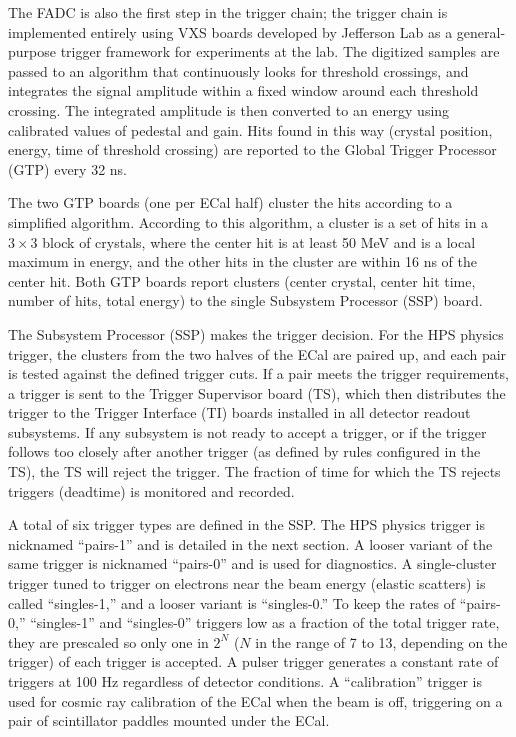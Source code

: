 The FADC is also the first step in the trigger chain; the trigger chain is implemented entirely using VXS boards developed by Jefferson Lab as a general-purpose trigger framework for experiments at the lab.
The digitized samples are passed to an algorithm that continuously looks for threshold crossings, and integrates the signal amplitude within a fixed window around each threshold crossing.
The integrated amplitude is then converted to an energy using calibrated values of pedestal and gain.
Hits found in this way (crystal position, energy, time of threshold crossing) are reported to the Global Trigger Processor (GTP) every 32 ns.

The two GTP boards (one per ECal half) cluster the hits according to a simplified algorithm.
According to this algorithm, a cluster is a set of hits in a $3\times 3$ block of crystals, where the center hit is at least 50 MeV and is a local maximum in energy, and the other hits in the cluster are within 16 ns of the center hit.
Both GTP boards report clusters (center crystal, center hit time, number of hits, total energy) to the single Subsystem Processor (SSP) board.

The Subsystem Processor (SSP) makes the trigger decision.
For the HPS physics trigger, the clusters from the two halves of the ECal are paired up, and each pair is tested against the defined trigger cuts.
If a pair meets the trigger requirements, a trigger is sent to the Trigger Supervisor board (TS), which then distributes the trigger to the Trigger Interface (TI) boards installed in all detector readout subsystems.
If any subsystem is not ready to accept a trigger, or if the trigger follows too closely after another trigger (as defined by rules configured in the TS), the TS will reject the trigger.
The fraction of time for which the TS rejects triggers (deadtime) is monitored and recorded.

A total of six trigger types are defined in the SSP.
The HPS physics trigger is nicknamed ``pairs-1'' and is detailed in the next section.
A looser variant of the same trigger is nicknamed ``pairs-0'' and is used for diagnostics.
A single-cluster trigger tuned to trigger on electrons near the beam energy (elastic scatters) is called ``singles-1,'' and a looser variant is ``singles-0.''
To keep the rates of ``pairs-0,'' ``singles-1'' and ``singles-0'' triggers low as a fraction of the total trigger rate, they are prescaled so only one in $2^N$ ($N$ in the range of 7 to 13, depending on the trigger) of each trigger is accepted.
A pulser trigger generates a constant rate of triggers at 100 Hz regardless of detector conditions.
A ``calibration'' trigger is used for cosmic ray calibration of the ECal when the beam is off, triggering on a pair of scintillator paddles mounted under the ECal.

